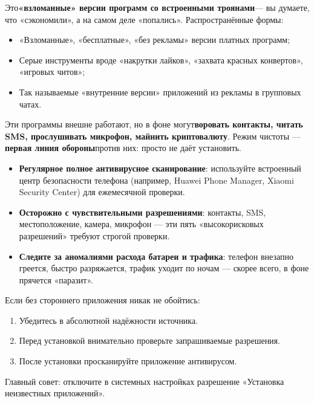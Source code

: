 Это\textbf{«взломанные» версии программ со встроенными троянами}— вы думаете, что «сэкономили», а на самом деле «попались». Распространённые формы:

\begin{itemize}
  \item «Взломанные», «бесплатные», «без рекламы» версии платных программ;
  \item Серые инструменты вроде «накрутки лайков», «захвата красных конвертов», «игровых читов»;
  \item Так называемые «внутренние версии» приложений из рекламы в групповых чатах.
\end{itemize}

Эти программы внешне работают, но в фоне могут\textbf{воровать контакты, читать SMS, прослушивать микрофон, майнить криптовалюту}. Режим чистоты —\textbf{первая линия обороны}против них: просто не даёт установить.


\begin{itemize}
  \item \textbf{Регулярное полное антивирусное сканирование}: используйте встроенный центр безопасности телефона (например, Huawei Phone Manager, Xiaomi Security Center) для ежемесячной проверки.
  \item \textbf{Осторожно с чувствительными разрешениями}: контакты, SMS, местоположение, камера, микрофон — эти пять «высокорисковых разрешений» требуют строгой проверки.
  \item \textbf{Следите за аномалиями расхода батареи и трафика}: телефон внезапно греется, быстро разряжается, трафик уходит по ночам — скорее всего, в фоне прячется «паразит».
\end{itemize}

Если без стороннего приложения никак не обойтись:

\begin{enumerate}
  \item Убедитесь в абсолютной надёжности источника.
  \item Перед установкой внимательно проверьте запрашиваемые разрешения.
  \item После установки просканируйте приложение антивирусом.
\end{enumerate}

Главный совет: отключите в системных настройках разрешение «Установка неизвестных приложений».



